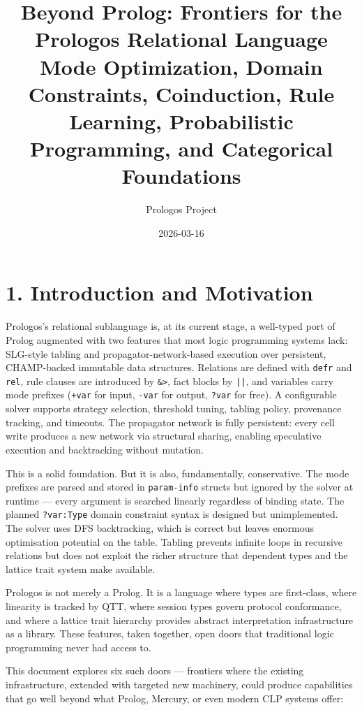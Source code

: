 \documentclass[11pt]{article}
\author{Prologos Project}
\date{2026-03-16}
\title{Beyond Prolog: Frontiers for the Prologos Relational Language\\\medskip
\large Mode Optimization, Domain Constraints, Coinduction, Rule Learning, Probabilistic Programming, and Categorical Foundations}
\begin{document}
\maketitle
\tableofcontents

\section{1. Introduction and Motivation}
\label{sec:orgb4348a0}

Prologos's relational sublanguage is, at its current stage, a well-typed port of
Prolog augmented with two features that most logic programming systems lack:
SLG-style tabling and propagator-network-based execution over persistent,
CHAMP-backed immutable data structures. Relations are defined with \texttt{defr} and
\texttt{rel}, rule clauses are introduced by \texttt{\&>}, fact blocks by \texttt{||}, and variables
carry mode prefixes (\texttt{+var} for input, \texttt{-var} for output, \texttt{?var} for free). A
configurable solver supports strategy selection, threshold tuning, tabling
policy, provenance tracking, and timeouts. The propagator network is fully
persistent: every cell write produces a new network via structural sharing,
enabling speculative execution and backtracking without mutation.

This is a solid foundation. But it is also, fundamentally, conservative. The
mode prefixes are parsed and stored in \texttt{param-info} structs but ignored by the
solver at runtime --- every argument is searched linearly regardless of binding
state. The planned \texttt{?var:Type} domain constraint syntax is designed but
unimplemented. The solver uses DFS backtracking, which is correct but leaves
enormous optimisation potential on the table. Tabling prevents infinite loops in
recursive relations but does not exploit the richer structure that dependent types
and the lattice trait system make available.

Prologos is not merely a Prolog. It is a language where types are first-class,
where linearity is tracked by QTT, where session types govern protocol
conformance, and where a lattice trait hierarchy provides abstract
interpretation infrastructure as a library. These features, taken together, open
doors that traditional logic programming never had access to.

This document explores six such doors --- frontiers where the existing
infrastructure, extended with targeted new machinery, could produce capabilities
that go well beyond what Prolog, Mercury, or even modern CLP systems offer:
\end{document}
